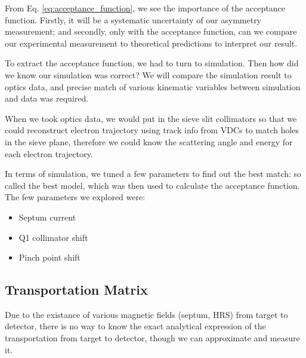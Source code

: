 From Eq. \ref{eq:acceptance_function}, we see the importance of the acceptance
function. Firstly, it will be a systematic uncertainty of our asymmetry
measurement; and secondly, only with the acceptance function, can we compare
our experimental measurement to theoretical predictions to interpret our
result.

To extract the acceptance function, we had to turn to simulation. Then how
did we know our simulation was correct? We will compare the simulation result
to optics data, and precise match of various kinematic variables between simulation
and data was required. 

When we took optics data, we would put in the sieve slit collimators so that 
we could reconstruct electron trajectory using track info from VDCs 
to match holes in the sieve plane, therefore we could know the scattering angle and 
energy for each electron trajectory.

In terms of simulation, we tuned a few parameters to find out the best
match: so called the best model, which was then used to calculate the acceptance
function. The few parameters we explored were:
\begin{itemize}
    \item Septum current
    \item Q1 collimator shift
    \item Pinch point shift
\end{itemize}

\subsection{Transportation Matrix}
Due to the existance of various magnetic fields (septum, HRS) from target to detector, 
there is no way to know the exact analytical expression of the transportation
from target to detector, though we can approximate and measure it.

